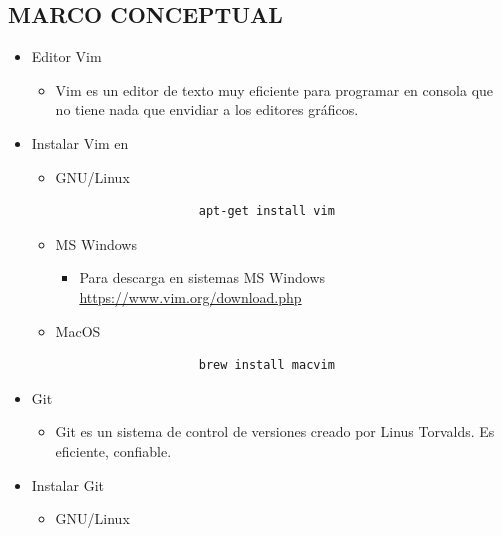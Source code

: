 \documentclass{article}
\begin{document}
\begin{itemize}
	\section{MARCO CONCEPTUAL}
	\begin{itemize}
		\item Editor Vim
        \begin{itemize}
            \item Vim es un editor de texto muy eficiente para programar en consola que no tiene nada que envidiar a los editores gráficos.
        \end{itemize}
        \item Instalar Vim en
        \begin{itemize}
            \item GNU/Linux
            \begin{itemize}
                \begin{lstlisting}
                    apt-get install vim
                \end{lstlisting}
            \end{itemize}
            \item MS Windows
            \begin{itemize}
                \item Para descarga en sistemas MS Windows \url{https://www.vim.org/download.php}
            \end{itemize}
            \item MacOS
            \begin{itemize}
                \begin{lstlisting}
                    brew install macvim
                \end{lstlisting}
            \end{itemize}
        \end{itemize}
        \item Git
        \begin{itemize}
            \item Git es un sistema de control de versiones creado por Linus Torvalds. Es eficiente, confiable.
        \end{itemize}
        \item Instalar Git
        \begin{itemize}
            \item GNU/Linux
            \begin{itemize}
                \begin{lstlisting}

\end{lstlisting}
\end{itemize}
\end{itemize}
\end{itemize}
\end{itemize}
\end{document}
